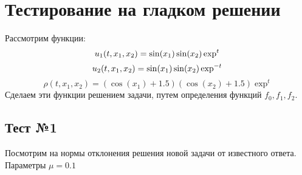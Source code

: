 \section{Тестирование на гладком решении}
Рассмотрим функции:
$$
	u_1 (t, x_1, x_2) = \sin(x_1) \sin(x_2) \exp^t \\
$$
$$
	u_2 (t, x_1, x_2) = \sin(x_1) \sin(x_2) \exp^{-t} \\
$$
$$
	\rho (t, x_1, x_2) = (\cos(x_1) + 1.5) (\cos(x_2) + 1.5) \exp^{t}
$$
Сделаем эти функции решением задачи, путем определения функций $f_0, f_1, f_2$.

\subsection{Тест №1}
Посмотрим на нормы отклонения решения новой задачи от известного ответа.
Параметры $\mu = 0.1$

